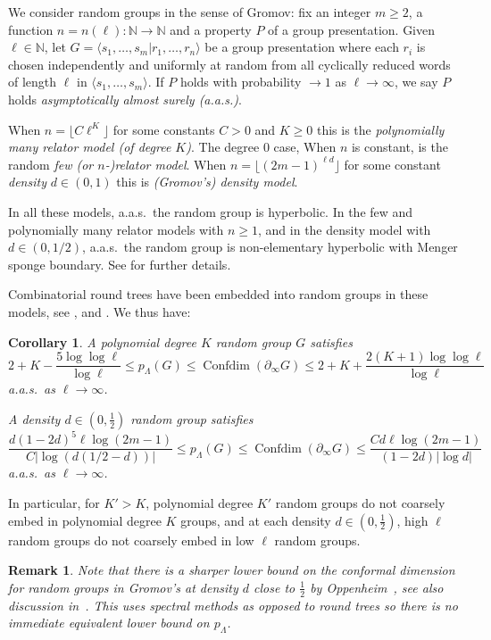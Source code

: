 \documentclass[11pt]{amsart}
\numberwithin{equation}{section}
\newtheorem{corollary}[equation]{Corollary}
\newtheorem{remark}[equation]{Remark}
\theoremstyle{citing}
\DeclareMathOperator{\Confdim}{Confdim}
\newcommand{\bdry}{\partial_\infty}
\newcommand{\N}{\mathbb{N}}
\newcommand{\pcrit}{p_{\Lambda}}
\numberwithin{equation}{section}
\begin{document}
We consider random groups in the sense of Gromov: 
fix an integer $m \geq 2$, a function $n=n(\ell):\N\to\N$ and a property $P$ of a group presentation.
Given $\ell\in \N$, let $G= \langle s_1,\ldots, s_m | r_1, \ldots, r_n\rangle$
be a group presentation where each $r_i$ is chosen independently and uniformly at random from all cyclically reduced words of length $\ell$ in $\langle s_1,\ldots, s_m \rangle$.  
If $P$ holds with probability $\to 1$ as $\ell \to \infty$, we say $P$ holds \emph{asymptotically almost surely (a.a.s.)}.

When $n = \lfloor C\ell^K \rfloor$ for some constants $C>0$ and $K \geq 0$ this is the \emph{polynomially many relator model (of degree $K$)}. The degree $0$ case, When $n$ is constant, is the random \emph{few (or $n$-)relator model}. When $n = \lfloor (2m-1)^{\ell d} \rfloor$ for some constant \emph{density} $d\in(0,1)$ this is \emph{(Gromov's) density model}.

In all these models, a.a.s.\ the random group is hyperbolic.  In the few and polynomially many relator models with $n \geq 1$, and in the density model with $d \in (0,1/2)$, a.a.s.\ the random group is non-elementary hyperbolic with Menger sponge boundary.  See \cite{Oll-05-rand-grp-survey, Mac-16-confdim-subcplxs} for further details.

Combinatorial round trees have been embedded into random groups in these models,
see 
\cite[\S 7.2]{Mac-16-confdim-subcplxs}, \cite[\S 8]{Mac-16-confdim-subcplxs} and \cite[\S 3.2, \S 5]{Frost-22-confdim-random}.
We thus have:
\begin{corollary}\label{cor:crit-exponent-rand-grp}
	A polynomial degree $K$ random group $G$ satisfies 
	\[
		2+K-\frac{5\log\log\ell}{\log\ell} 
		\leq \pcrit(G) 
		\leq \Confdim(\bdry G)
		\leq 2+K + \frac{2(K+1)\log\log\ell}{\log\ell}
	\] 
	a.a.s.\ as $\ell \to \infty$.

	A density $d \in (0,\frac{1}{2})$ random group satisfies 
	\[
		\frac{d(1-2d)^5 \ell \log(2m-1)}{C|\log(d(1/2-d))|} 
		\leq \pcrit(G) 
		\leq \Confdim(\bdry G)
		\leq \frac{Cd\ell \log(2m-1)}{(1-2d)|\log d|}
	\]
	a.a.s.\ as $\ell \to \infty$.
\end{corollary}
In particular, for $K'>K$, polynomial degree $K'$ random groups do not coarsely embed in polynomial degree $K$ groups,
and at each density $d\in (0,\frac{1}{2})$, high $\ell$ random groups do not coarsely embed in low $\ell$ random groups.

\begin{remark}
	Note that there is a sharper lower bound on the conformal dimension for random groups in Gromov's at density $d$ close to $\frac{1}{2}$ by Oppenheim~\cite{Oppenheim-23-FLp-rand-gromov-model}, see also discussion in~\cite[Section 1]{Frost-22-confdim-random}.  This uses spectral methods as opposed to round trees so there is no immediate equivalent lower bound on $p_\Lambda$.
\end{remark}
\end{document}
